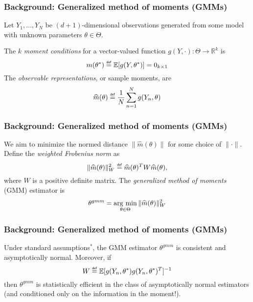 \documentclass[10pt, compress]{beamer}
\newcommand{\defeq}{\mathrel{\overset{\makebox[0pt]{\mbox{\normalfont\tiny\sffamily def}}}{=}}}
\begin{document}
\begin{frame}[fragile]
  \frametitle{Background: Generalized method of moments (GMMs)}

  Let $Y_1,\ldots,Y_N$ be $(d+1)$-dimensional observations generated from some
  model with unknown parameters $\theta\in\Theta$.

The $k$ \emph{moment conditions} for a vector-valued function $g(Y,\cdot):\Theta\to\mathbb{R}^k$ is
\begin{equation*}
m(\theta^*) \defeq \mathbb{E}[g(Y,\theta^*)] = 0_{k\times 1}
\end{equation*}
The \emph{observable representations}, or sample moments, are
\begin{equation*}
\widehat m(\theta) \defeq \frac{1}{N}\sum_{n=1}^N g(Y_n,\theta)
\end{equation*}
\end{frame}

\begin{frame}[fragile]
  \frametitle{Background: Generalized method of moments (GMMs)}

We aim to minimize the normed
distance $\|\widehat m(\theta)\|$ for some choice of $\|\cdot\|$. Define the \emph{weighted Frobenius norm} as
\begin{equation*}
\|\widehat m(\theta)\|_W^2 \defeq \widehat m(\theta)^T W \widehat m(\theta),
\end{equation*}
where $W$ is a positive definite matrix. The \emph{generalized method of moments} (GMM) estimator is
\begin{equation*}
\theta^{gmm} = \operatornamewithlimits{arg\ min}_{\theta\in\Theta}
\|\widehat m(\theta)\|_W^2
\end{equation*}

\end{frame}

\begin{frame}[fragile]
  \frametitle{Background: Generalized method of moments (GMMs)}

  Under standard assumptions$^*$, the GMM estimator $\theta^{gmm}$ is consistent and
  asymptotically normal. Moreover, if
  \begin{equation*}
  W\defeq \mathbb{E}[g(Y_n,\theta^*)g(Y_n,\theta^*)^T]^{-1}
  \end{equation*}
  then $\theta^{gmm}$ is statistically efficient in the class of asymptotically
  normal estimators (and conditioned only on the information in the moment!).

\end{frame}
\end{document}
